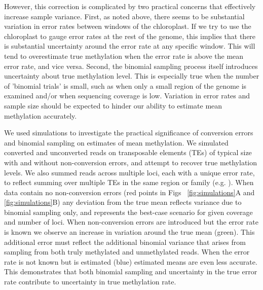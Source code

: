 \documentclass[10pt,letterpaper,draft]{article}
\begin{document}
However, this correction is complicated by two practical concerns that effectively increase sample variance.
First, as noted above, there seems to be substantial variation in error rates between windows of the chloroplast.
If we try to use the chloroplast to gauge error rates at the rest of the genome, this implies that there is substantial uncertainty around the error rate at any specific window.
This will tend to overestimate true methylation when the error rate is above the mean error rate, and vice versa.
Second, the binomial sampling process itself introduces uncertainty about true methylation level.
This is especially true when the number of 'binomial trials' is small, such as when only a small region of the genome is examined and/or when sequencing coverage is low.
Variation in error rates and sample size should be expected to hinder our ability to estimate mean methylation accurately.

We used simulations to investigate the practical significance of conversion errors and binomial sampling on estimates of mean methylation.
We simulated converted and unconverted reads on transposable elements (TEs) of typical size with and without non-conversion errors, and attempt to recover true methylation levels.
We also summed reads across multiple loci, each with a unique error rate, to reflect summing over multiple TEs in the same region or family (e.g. \cite{sasaki2019common}).
When data contain no non-conversion errors (red points in Figs ~\ref{fig:simulations}A and \ref{fig:simulations}B) any deviation from the true mean reflects variance due to binomial sampling only, and represents the best-case scenario for given coverage and number of loci.
When non-conversion errors are introduced but the error rate is known we observe an increase in variation around the true mean (green).
This additional error must reflect the additional binomial variance that arises from sampling from both truly methylated and unmethylated reads.
When the error rate is not known but is estimated (blue) estimated means are even less accurate.
This demonstrates that both binomial sampling and uncertainty in the true error rate contribute to uncertainty in true methylation rate.
\end{document}
